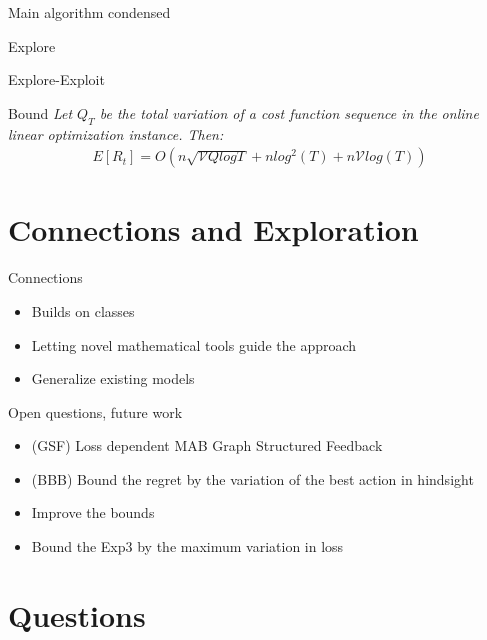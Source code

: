 \documentclass{beamer}
\begin{document}
\begin{frame}{Main algorithm condensed}
  
\end{frame}

\begin{frame}{Explore}
  
\end{frame}
\begin{frame}{Explore-Exploit}
  
\end{frame}


\begin{frame}{Bound}
  \textit{Let $Q_T$ be the total variation of a cost function sequence in the online linear optimization instance. Then:}
  \begin{align*}
    E[R_t] = O(n \sqrt{\mathcal{V}Q log T} + n log^2(T) + n \mathcal{V}log(T))
  \end{align*}
\end{frame}

\section{Connections and Exploration}
\begin{frame}{Connections}
  \begin{itemize}
  \item
    Builds on classes
  \item
    Letting novel mathematical tools guide the approach
  \item 
    Generalize existing models
  \end{itemize}
\end{frame}

\begin{frame}{Open questions, future work}
  \begin{itemize}
    \item (GSF) Loss dependent MAB Graph Structured Feedback
    \item (BBB) Bound the regret by the variation of the best action in hindsight
    \item Improve the bounds
    \item Bound the Exp3 by the maximum variation in loss
  \end{itemize}
\end{frame}

\section{Questions}
\end{document}
